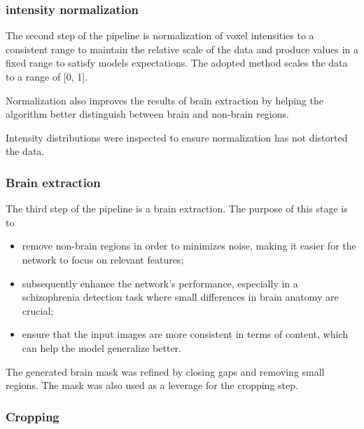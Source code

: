 \subsubsection{intensity normalization}

The second step of the pipeline is normalization of voxel intensities to a consistent range to maintain the relative scale of the data and produce values in a fixed range to satisfy models expectations. The adopted method scales the data to a range of [0, 1].

Normalization also improves the results of brain extraction by helping the algorithm better distinguish between brain and non-brain regions.

Intensity distributions were inspected to ensure normalization has not distorted the data.

\subsubsection{Brain extraction}

The third step of the pipeline is a brain extraction. The purpose of this stage is to
\begin{itemize}
    \item remove non-brain regions in order to minimizes noise, making it easier for the network to focus on relevant features;
    \item subsequently enhance the network's performance, especially in a schizophrenia detection task where small differences in brain anatomy are crucial;
    \item ensure that the input images are more consistent in terms of content, which can help the model generalize better.
\end{itemize}

The generated brain mask was refined by closing gaps and removing small regions. The mask was also used as a leverage for the cropping step.



\subsubsection{Cropping}

